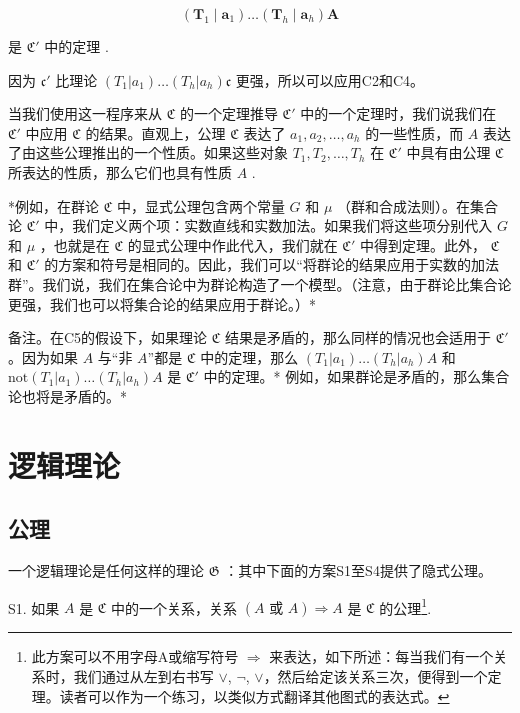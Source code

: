 \[
\left(\boldsymbol {T} _ {1} \mid \boldsymbol {a} _ {1}\right) \dots \left(\boldsymbol {T} _ {h} \mid \boldsymbol {a} _ {h}\right) \boldsymbol {A}
\]

是 \(\mathfrak{C}'\) 中的定理 .

因为 \(\mathfrak{c}'\) 比理论 \((T_1|a_1) \ldots (T_h|a_h)\mathfrak{c}\) 更强，所以可以应用C2和C4。

当我们使用这一程序来从 \(\mathfrak{C}\) 的一个定理推导 \(\mathfrak{C}'\) 中的一个定理时，我们说我们在 \(\mathfrak{C}'\) 中应用 \(\mathfrak{C}\) 的结果。直观上，公理 \(\mathfrak{C}\) 表达了 \(a_1, a_2, \ldots, a_h\) 的一些性质，而 \(A\) 表达了由这些公理推出的一个性质。如果这些对象 \(T_1, T_2, \ldots, T_h\) 在 \(\mathfrak{C}'\) 中具有由公理 \(\mathfrak{C}\) 所表达的性质，那么它们也具有性质 \(A\) .

*例如，在群论 \(\mathfrak{C}\) 中，显式公理包含两个常量 \(G\) 和 \(\mu\) （群和合成法则）。在集合论 \(\mathfrak{C}'\) 中，我们定义两个项：实数直线和实数加法。如果我们将这些项分别代入 \(G\) 和 \(\mu\) ，也就是在 \(\mathfrak{C}\) 的显式公理中作此代入，我们就在 \(\mathfrak{C}'\) 中得到定理。此外， \(\mathfrak{C}\) 和 \(\mathfrak{C}'\) 的方案和符号是相同的。因此，我们可以“将群论的结果应用于实数的加法群”。我们说，我们在集合论中为群论构造了一个模型。（注意，由于群论比集合论更强，我们也可以将集合论的结果应用于群论。）*

备注。在C5的假设下，如果理论 \(\mathfrak{C}\) 结果是矛盾的，那么同样的情况也会适用于 \(\mathfrak{C}'\) 。因为如果 \(A\) 与“非 \(A\)”都是 \(\mathfrak{C}\) 中的定理，那么 \((T_1|a_1)\ldots (T_h|a_h)A\) 和 \(\mathrm{not}(T_1|a_1)\ldots (T_h|a_h)A\) 是 \(\mathfrak{C}'\) 中的定理。* 例如，如果群论是矛盾的，那么集合论也将是矛盾的。*

\section{逻辑理论}

\subsection{公理}

一个逻辑理论是任何这样的理论 \(\mathfrak{G}\) ：其中下面的方案S1至S4提供了隐式公理。

S1. 如果 \(A\) 是 \(\mathfrak{C}\) 中的一个关系，关系 \((A \text{ 或 } A) \Longrightarrow A\) 是 \(\mathfrak{C}\) 的公理\footnote{此方案可以不用字母A或缩写符号 \(\Longrightarrow\) 来表达，如下所述：每当我们有一个关系时，我们通过从左到右书写 \(\vee\), \(\neg\), \(\vee\)，然后给定该关系三次，便得到一个定理。读者可以作为一个练习，以类似方式翻译其他图式的表达式。}.


